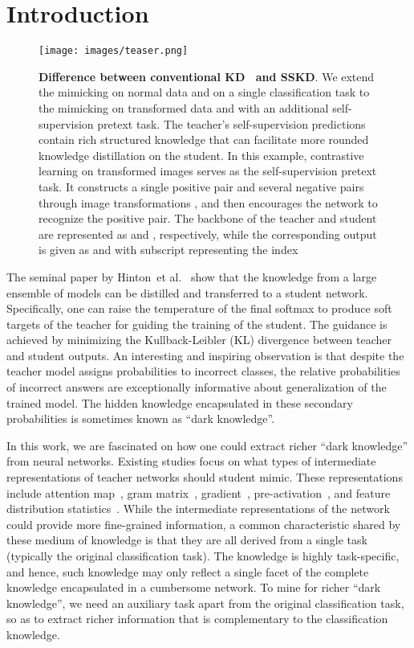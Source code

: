 \documentclass[runningheads]{llncs}
\newcommand{\etal}{et al.}
\begin{document}
\section{Introduction}

\begin{figure}[t]
\centering
\texttt{[image: images/teaser.png]}
\vspace{-8pt}
\caption{\textbf{Difference between conventional KD~\cite{KD} and SSKD}. We extend the mimicking on normal data and on a single classification task to the mimicking on transformed data and with an additional self-supervision pretext task.  The teacher's self-supervision predictions contain rich structured knowledge that can facilitate more rounded knowledge distillation on the student. In this example, contrastive learning on transformed images serves as the self-supervision pretext task. It constructs a single positive pair and several negative pairs through image transformations , and then encourages the network to recognize the positive pair. The backbone of the teacher and student are represented as  and , respectively, while the corresponding output is given as  and  with subscript representing the index}
\label{fig:teaser}
\vspace{-0.5cm}
\end{figure}

 


The seminal paper by Hinton~\etal~\cite{KD} show that the knowledge from a large ensemble of models can be distilled and transferred to a student network.
Specifically, one can raise the temperature of the final softmax to produce soft targets of the teacher for guiding the training of the student. The guidance is achieved by minimizing the Kullback-Leibler (KL) divergence between teacher and student outputs.
An interesting and inspiring observation is that despite the teacher model assigns probabilities to incorrect classes, the relative probabilities of incorrect answers are exceptionally informative about generalization of the trained model.
The hidden knowledge encapsulated in these secondary probabilities is sometimes known as ``dark knowledge''.

In this work, we are fascinated on how one could extract richer ``dark knowledge'' from neural networks. Existing studies focus on what types of intermediate representations of teacher networks should student mimic.
These representations include attention map~\cite{AT}, gram matrix~\cite{FSP}, gradient~\cite{jacob}, pre-activation~\cite{AB}, and feature distribution statistics~\cite{intrakd}. 
While the intermediate representations of the network could provide more fine-grained information, a common characteristic shared by these medium of knowledge is that they are all derived from a single task (typically the original classification task).
The knowledge is highly task-specific, and hence, such knowledge may only reflect a single facet of the complete knowledge encapsulated in a cumbersome network.
To mine for richer “dark knowledge”, we need an auxiliary task apart from the original classification task, so as to extract richer information that is complementary to the classification knowledge.
\end{document}
